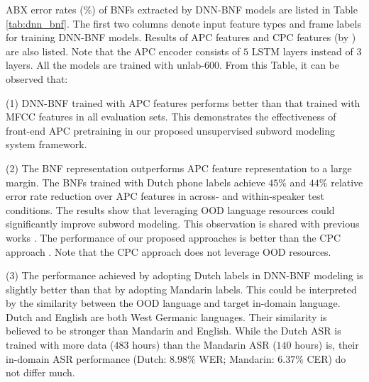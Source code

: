 \documentclass[a4paper]{article}
\begin{document}
ABX error rates (\%) of BNFs extracted by  DNN-BNF  models are listed in Table \ref{tab:dnn_bnf}. The first two columns  denote input feature types and frame labels for training DNN-BNF models.
Results of    APC features and CPC features (by \cite{kahn2019librilight}) are also listed. Note that the APC encoder consists of $5$ LSTM layers instead of $3$ layers. All the models are trained with unlab-600.   From this Table, it can be observed  that:

(1) DNN-BNF trained with APC features performs better than that trained with MFCC features in all evaluation sets. This  demonstrates the effectiveness of front-end APC pretraining in our proposed unsupervised subword modeling system framework.

(2) The BNF representation outperforms APC feature representation to a large margin. The  BNFs trained with  Dutch phone labels  achieve $45\%$ and $44\%$ relative error rate reduction over APC features in across- and within-speaker test conditions. 
The results show that leveraging OOD language resources could significantly improve subword modeling. This observation is shared with previous works \cite{shibata2017composite,feng2019_TASLP}. The performance of our proposed approaches is better than the CPC approach  \cite{riviere2020unsupervised}. Note that the CPC approach does not leverage OOD resources.

(3) The performance achieved by adopting Dutch labels in DNN-BNF modeling is slightly better than that by adopting Mandarin labels. 
This could be interpreted by the similarity between the OOD language and target in-domain language. Dutch and English are both West Germanic languages. Their similarity is believed to be stronger than Mandarin and English. While the Dutch ASR  is trained with more data ($483$ hours) than the Mandarin ASR ($140$ hours) is, their in-domain ASR performance (Dutch: $8.98\%$ WER; Mandarin: $6.37\%$ CER) do not differ much. 




\end{document}
